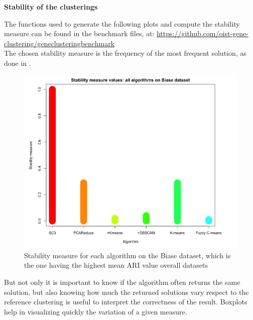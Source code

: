 \documentclass{report}
\begin{document}
{%

\bigskip
\noindent \textbf{Stability of the clusterings}
\bigskip

The functions used to generate the following plots and compute the stability measure can be found in the benchmark files, at: {\url{https://github.com/oist-gene-clustering/geneclusteringbenchmark}}\\

The chosen stability measure is the frequency of the most frequent solution, as done in \cite{kiselev2016sc3}.

\begin{figure}[H]
\centering
\includegraphics[scale=0.4]{benchmark/stabilityOne.png}
\caption{Stability measure for each algorithm on the Biase dataset, which is the one having the highest mean ARI value overall datasets}
\label{stability}
\end{figure}

But not only it is important to know if the algorithm often returns the same solution, but also knowing how much the returned solutions vary respect to the reference clustering is useful to interpret the correctness of the result. Boxplots help in visualizing quickly the variation of a given measure. 

}
\end{document}
